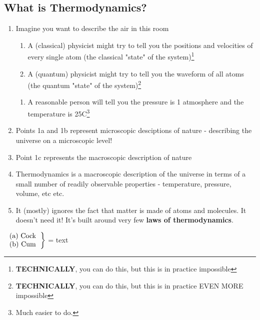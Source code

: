 \documentclass[../CHEM152Notes.tex]{subfiles}
\begin{document}
\subsection*{What is Thermodynamics?}
\begin{enumerate}
    \item Imagine you want to describe the air in this room
    \begin{enumerate}
        \item A (classical) physicist might try to tell you the positions and velocities of every single atom (the classical "state" of the system)\footnote{\textbf{TECHNICALLY}, you can do this, but this is in practice impossible}
        \item A (quantum) physicist might try to tell you the waveform of all atoms (the quantum "state" of the system)\footnote{\textbf{TECHNICALLY}, you can do this, but this is in practice EVEN MORE impossible}
    \end{enumerate}
    \begin{enumerate}
        \item A reasonable person will tell you the pressure is 1 atmosphere and the temperature is 25C\footnote{Much easier to do.}
    \end{enumerate}
    \item Points 1a and 1b represent microscopic desciptions of nature - describing the universe on a microscopic level!
    \item Point 1c represents the macroscopic description of nature
    \item Thermodynamics is a macroscopic description of the universe in terms of a small number of readily observable properties - temperature, pressure, volume, etc etc.
    \item It (mostly) ignores the fact that matter is made of atoms and molecules. It doesn't need it! It's built around very few \textbf{laws of thermodynamics}. 
\end{enumerate}
$\left.
    \begin{tabular}{ll}
        (a) Cock \\
        (b) Cum
    \end{tabular}
\right\}$  = text
    
\end{document}
